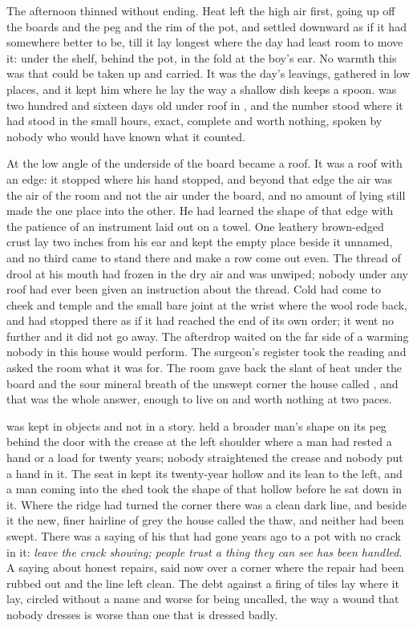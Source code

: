The afternoon thinned without ending. Heat left the high air first, going up off the boards and the peg and the rim of the pot, and settled downward as if it had somewhere better to be, till it lay longest where the day had least room to move it: under the shelf, behind the pot, in the fold at the boy's ear. No warmth this was that could be taken up and carried. It was the day's leavings, gathered in low places, and it kept him where he lay the way a shallow dish keeps a spoon.  was two hundred and sixteen days old under  roof in , and the number stood where it had stood in the small hours, exact, complete and worth nothing, spoken by nobody who would have known what it counted.

At the low angle of  the underside of the board became a roof. It was a roof with an edge: it stopped where his hand stopped, and beyond that edge the air was the air of the room and not the air under the board, and no amount of lying still made the one place into the other. He had learned the shape of that edge with the patience of an instrument laid out on a towel. One leathery brown-edged crust lay two inches from his ear and kept the empty place beside it unnamed, and no third came to stand there and make a row come out even. The thread of drool at his mouth had frozen in the dry air and was unwiped; nobody under any roof had ever been given an instruction about the thread. Cold had come to cheek and temple and the small bare joint at the wrist where the wool rode back, and had stopped there as if it had reached the end of its own order; it went no further and it did not go away. The afterdrop waited on the far side of a warming nobody in this house would perform. The surgeon's register took the reading and asked the room what it was for. The room gave back the slant of heat under the board and the sour mineral breath of the unswept corner the house called , and that was the whole answer, enough to live on and worth nothing at two paces.

 was kept in objects and not in a story.  held a broader man's shape on its peg behind the door with the crease at the left shoulder where a man had rested a hand or a load for twenty years; nobody straightened the crease and nobody put a hand in it. The seat in  kept its twenty-year hollow and its lean to the left, and a man coming into the shed took the shape of that hollow before he sat down in it. Where the  ridge had turned the corner there was a clean dark line, and beside it the new, finer hairline of grey the house called the thaw, and neither had been swept. There was a saying of his that had gone years ago to a pot with no crack in it: \emph{leave the crack showing; people trust a thing they can see has been handled}. A saying about honest repairs, said now over a corner where the repair had been rubbed out and the line left clean. The debt against a firing of tiles lay where it lay, circled without a name and worse for being uncalled, the way a wound that nobody dresses is worse than one that is dressed badly.

